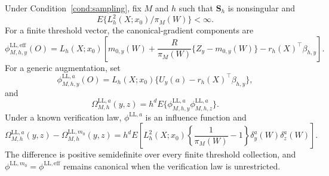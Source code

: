 \begin{proposition}
\label{prop:local-linear}
Under Condition~\ref{cond:sampling}, fix \(M\) and \(h\) such that
\(\mathbf S_h\) is nonsingular and
\[
E\{L_h^2(X;x_0)/\pi_M(W)\}<\infty.
\]
For a finite threshold vector, the canonical-gradient components are
\begin{equation}
\phi_{M,h,y}^{\mathrm{LL},\mathrm{eff}}(O)
=
L_h(X;x_0)
\left[
 m_{0,y}(W)
 +\frac{R}{\pi_M(W)}\{Z_y-m_{0,y}(W)\}
 -r_h(X)^\top\beta_{h,y}
\right].
\label{eq:ll-efficient-if}
\end{equation}
For a generic augmentation, set
\begin{equation}
\phi_{M,h,y}^{\mathrm{LL},a}(O)
=
L_h(X;x_0)
\{U_y(a)-r_h(X)^\top\beta_{h,y}\},
\label{eq:ll-influence}
\end{equation}
and
\[
\Omega_{M,h}^{\mathrm{LL},a}(y,z)
=
h^dE\{\phi_{M,h,y}^{\mathrm{LL},a}
        \phi_{M,h,z}^{\mathrm{LL},a}\}.
\]
Under a known verification law, \(\phi^{\mathrm{LL},a}\) is an influence function and
\begin{equation}
\Omega_{M,h}^{\mathrm{LL},a}(y,z)
-
\Omega_{M,h}^{\mathrm{LL},m_0}(y,z)
=
h^dE\left[
L_h^2(X;x_0)
\left\{\frac1{\pi_M(W)}-1\right\}
\delta_y^a(W)\delta_z^a(W)
\right].
\label{eq:ll-psd}
\end{equation}
The difference is positive semidefinite over every finite threshold collection, and \(\phi^{\mathrm{LL},m_0}=\phi^{\mathrm{LL},\mathrm{eff}}\) remains canonical when the verification law is unrestricted.


\end{proposition}
